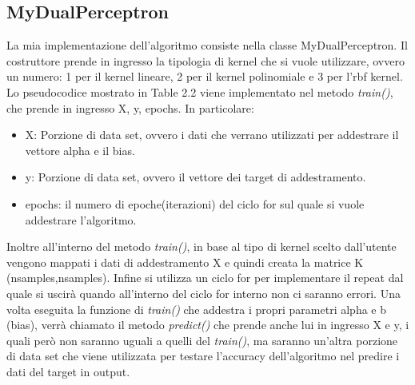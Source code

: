 \documentclass{article}
\begin{document}
    \subsection{MyDualPerceptron}
    La mia implementazione dell'algoritmo consiste nella classe MyDualPerceptron. Il costruttore prende in ingresso la tipologia di kernel che si vuole utilizzare, ovvero un numero: 1 per il kernel lineare, 2 per il kernel polinomiale e 3 per l'rbf kernel. Lo pseudocodice mostrato in Table 2.2 viene implementato nel metodo \textit{train()}, che prende in ingresso X, y, epochs. In particolare:
    \begin{itemize}
    	\item X: Porzione di data set, ovvero i dati che verrano utilizzati per addestrare il vettore alpha e il bias.
    	\item y: Porzione di data set, ovvero il vettore dei target di addestramento.
    	\item epochs: il numero di epoche(iterazioni) del ciclo for sul quale si vuole addestrare l'algoritmo.
    \end{itemize}
	Inoltre all'interno del metodo \textit{train()}, in base al tipo di kernel scelto dall'utente vengono mappati i dati di addestramento X e quindi creata la matrice K (nsamples,nsamples). Infine si utilizza un ciclo for per implementare il repeat dal quale si uscirà quando all'interno del ciclo for interno non ci saranno errori.
    Una volta eseguita la funzione di \textit{train()} che addestra i propri parametri alpha e b (bias), verrà chiamato il metodo \textit{predict()} che prende anche lui in ingresso X e y, i quali però non saranno uguali a quelli del \textit{train()}, ma saranno un'altra porzione di data set che viene utilizzata per testare l'accuracy dell'algoritmo nel predire i dati del target in output.
\end{document}

